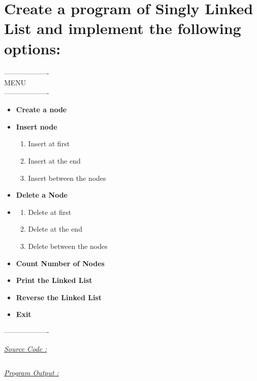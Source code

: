 \documentclass{report}
\begin{document}
\section{Create a program of Singly Linked List and implement the following options:} 
\begin{center}
  ------------------- \\
            MENU \\
  ------------------- \\
  \begin{varwidth}{\textwidth}
    \begin{itemize}
      \item  \textbf {Create a node}
      \item  \textbf {Insert node}
      \begin{enumerate}[label=(\Roman*)]
        \item Insert at first
        \item Insert at the end
        \item Insert between the nodes 
      \end{enumerate}
      \item  \textbf {Delete a Node}
      \item \begin{enumerate}[label=(\Roman*)]
        \item Delete at first
        \item Delete at the end
        \item Delete between the nodes 
      \end{enumerate}
      \item  \textbf {Count Number of Nodes}
      \item  \textbf {Print the Linked List}
      \item  \textbf {Reverse the Linked List}
      \item  \textbf {Exit}
    \end{itemize}
    ------------------- \\
  \end{varwidth}
\end{center}   
\bigbreak
\underline{\emph{\Large Source Code :}}
\inputminted[breaklines]{c}{../Linked_List/singly_linked_list.c}
\bigbreak
\noindent
\underline{\emph{\Large Program Output :}}
\bigbreak
\noindent
\end{document}
